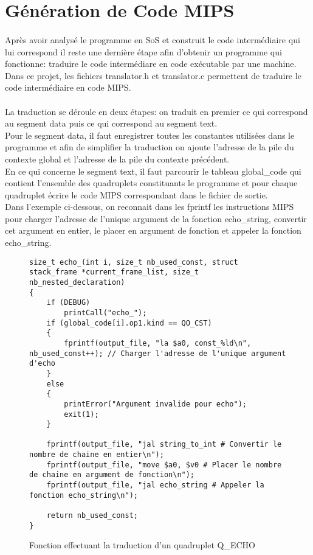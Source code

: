 \section{Génération de Code MIPS}

\paragraph{}
Après avoir analysé le programme en SoS et construit le code intermédiaire qui lui correspond il reste une dernière étape afin d'obtenir un programme qui fonctionne: traduire le code intermédiare en code exécutable par une machine.\\
Dans ce projet, les fichiers \textsf{translator.h} et \textsf{translator.c} permettent de traduire le code intermédiaire en code MIPS.

\paragraph{}
La traduction se déroule en deux étapes: on traduit en premier ce qui correspond au segment data puis ce qui correspond au segment text.\\
Pour le segment data, il faut enregistrer toutes les constantes utilisées dans le programme et afin de simplifier la traduction on ajoute l'adresse de la pile du contexte global et l'adresse de la pile du contexte précédent.\\
En ce qui concerne le segment text, il faut parcourir le tableau \textsf{global\_code} qui contient l'ensemble des quadruplets constituants le programme et pour chaque quadruplet écrire le code MIPS correspondant dans le fichier de sortie.\\
Dans l'exemple ci-dessous, on reconnait dans les \textsf{fprintf} les instructions MIPS pour charger l'adresse de l'unique argument de la fonction \textsf{echo\_string}, convertir cet argument en entier, le placer en argument de fonction et appeler la fonction \textsf{echo\_string}. 
\begin{figure}[H]
\begin{lstlisting}
size_t echo_(int i, size_t nb_used_const, struct stack_frame *current_frame_list, size_t nb_nested_declaration)
{
    if (DEBUG)
        printCall("echo_");
    if (global_code[i].op1.kind == QO_CST)
    {
        fprintf(output_file, "la $a0, const_%ld\n", nb_used_const++); // Charger l'adresse de l'unique argument d'echo
    }
    else
    {
        printError("Argument invalide pour echo");
        exit(1);
    }

    fprintf(output_file, "jal string_to_int # Convertir le nombre de chaine en entier\n");
    fprintf(output_file, "move $a0, $v0 # Placer le nombre de chaine en argument de fonction\n");
    fprintf(output_file, "jal echo_string # Appeler la fonction echo_string\n");

    return nb_used_const;
}
\end{lstlisting}
\caption{Fonction effectuant la traduction d'un quadruplet \textsf{Q\_ECHO}}
\end{figure}
